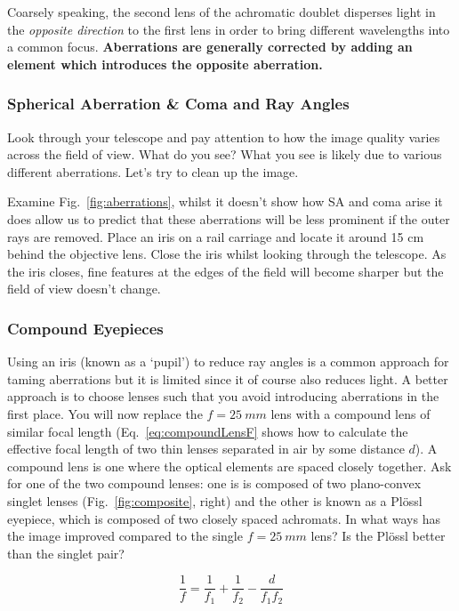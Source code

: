 \documentclass[a4paper]{report}
\begin{document}
Coarsely speaking, the second lens of the achromatic doublet disperses light in the \textit{opposite direction} to the first lens in order to bring different wavelengths into a common focus. 
\textbf{Aberrations are generally corrected by adding an element which introduces the opposite aberration.}






\subsubsection{Spherical Aberration \& Coma and Ray Angles}
Look through your telescope and pay attention to how the image quality varies across the field of view. 
What do you see?
What you see is likely due to various different aberrations. 
Let's try to clean up the image. 

Examine Fig.~\ref{fig:aberrations}, whilst it doesn't show how SA and coma arise it does allow us to predict that these aberrations will be less prominent if the outer rays are removed. 
Place an iris on a rail carriage and locate it around 15 cm behind the objective lens. 
Close the iris whilst looking through the telescope. 
As the iris closes, fine features at the edges of the field will become sharper but the field of view doesn't change. 




\subsubsection{Compound Eyepieces}
Using an iris (known as a `pupil') to reduce ray angles is a common approach for taming aberrations but it is limited since it of course also reduces light. 
A better approach is to choose lenses such that you avoid introducing aberrations in the first place. 
You will now replace the $f=25~mm$ lens with a compound lens of similar focal length (Eq.~\ref{eq:compoundLensF} shows how to calculate the effective focal length of two thin lenses separated in air by some distance $d$). 
A compound lens is one where the optical elements are spaced closely together. 
Ask for one of the two compound lenses: one is is composed of two plano-convex singlet lenses (Fig.~\ref{fig:composite}, right)
and the other is known as a Pl\"{o}ssl eyepiece, which is composed of two closely spaced achromats. 
In what ways has the image improved compared to the single $f=25~mm$ lens?
Is the Pl\"{o}ssl better than the singlet pair?

\begin{equation}
\frac{1}{f} = \frac{1}{f_1} + \frac{1}{f_2} - \frac{d}{f_1f_2}
\label{eq:compoundLensF}
\end{equation}
\end{document}
